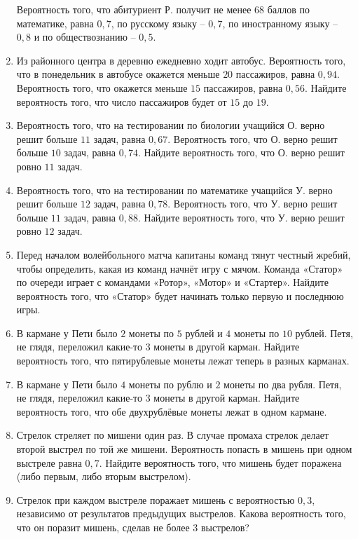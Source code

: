\documentclass[12pt, a4paper]{article}
\begin{document}
\begin{enumerate}
		Вероятность того, что абитуриент Р. получит не менее \( 68 \) баллов по математике, равна \( 0,7 \), по русскому языку – \(  0,7 \), по иностранному языку – \( 0,8  \) и по обществознанию – \( 0,5 \).
		\item Из районного центра в деревню ежедневно ходит автобус. Вероятность того, что в понедельник в автобусе окажется меньше \( 20 \) пассажиров, равна \(  0,94 \). Вероятность того, что окажется меньше \( 15 \) пассажиров, равна \( 0,56 \). Найдите вероятность того, что число пассажиров будет от \( 15 \) до \( 19 \).
		\item Вероятность того, что на тестировании по биологии учащийся О. верно решит больше \( 11 \) задач, равна \( 0,67 \). Вероятность того, что О. верно решит больше \( 10 \) задач, равна \( 0,74 \). Найдите вероятность того, что О. верно решит ровно \( 11 \) задач.
		\item Вероятность того, что на тестировании по математике учащийся У. верно решит больше \( 12 \) задач, равна \( 0,78 \). Вероятность того, что У. верно решит больше \( 11 \) задач, равна \( 0,88 \). Найдите вероятность того, что У. верно решит ровно \( 12 \) задач.
		\item Перед началом волейбольного матча капитаны команд тянут честный жребий, чтобы определить, какая из команд начнёт игру с мячом. Команда «Статор» по очереди играет с командами «Ротор», «Мотор» и «Стартер». Найдите вероятность того, что «Статор» будет начинать только первую и последнюю игры.
		\item В кармане у Пети было \( 2 \) монеты по \( 5 \) рублей и \( 4 \) монеты по \( 10 \) рублей. Петя, не глядя, переложил какие-то \( 3 \) монеты в другой карман. Найдите вероятность того, что пятирублевые монеты лежат теперь в разных карманах.
		\item В кармане у Пети было \( 4 \) монеты по рублю и \( 2 \) монеты по два рубля. Петя, не глядя, переложил какие-то \( 3 \) монеты в другой карман. Найдите вероятность того, что обе двухрублёвые монеты лежат в одном кармане.
		\item Стрелок стреляет по мишени один раз. В случае промаха стрелок делает второй выстрел по той же мишени. Вероятность попасть в мишень при одном выстреле равна \( 0,7 \). Найдите вероятность того, что мишень будет поражена (либо первым, либо вторым выстрелом).
		\item Стрелок при каждом выстреле поражает мишень с вероятностью \( 0,3 \), независимо от результатов предыдущих выстрелов. Какова вероятность того, что он поразит мишень, сделав не более \( 3 \) выстрелов?

\end{enumerate}
\end{document}
